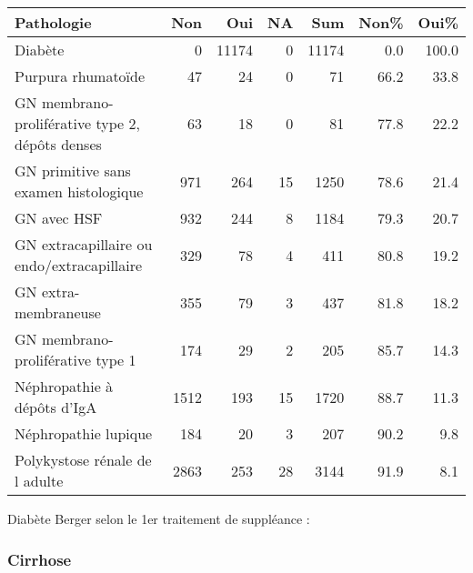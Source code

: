 \documentclass[11pt,a4paper]{article}\usepackage[]{graphicx}\usepackage[]{color}
\begin{document}
\begin{table}[H]
\centering
\begin{tabular}{lrrrrrr}
  \hline
Pathologie & Non & Oui & NA & Sum & Non\% & Oui\% \\ 
  \hline
Diabète &  0 & 11174 &  0 & 11174 & 0.0 & 100.0 \\ 
  Purpura rhumatoïde & 47 & 24 &  0 & 71 & 66.2 & 33.8 \\ 
  GN membrano-proliférative type 2, dépôts denses & 63 & 18 &  0 & 81 & 77.8 & 22.2 \\ 
  GN primitive sans examen histologique & 971 & 264 & 15 & 1250 & 78.6 & 21.4 \\ 
  GN avec HSF & 932 & 244 &  8 & 1184 & 79.3 & 20.7 \\ 
  GN extracapillaire ou endo/extracapillaire & 329 & 78 &  4 & 411 & 80.8 & 19.2 \\ 
  GN extra-membraneuse & 355 & 79 &  3 & 437 & 81.8 & 18.2 \\ 
  GN membrano-proliférative type 1 & 174 & 29 &  2 & 205 & 85.7 & 14.3 \\ 
  Néphropathie à dépôts d'IgA & 1512 & 193 & 15 & 1720 & 88.7 & 11.3 \\ 
  Néphropathie lupique & 184 & 20 &  3 & 207 & 90.2 & 9.8 \\ 
  Polykystose rénale de l adulte & 2863 & 253 & 28 & 3144 & 91.9 & 8.1 \\ 
   \hline
\end{tabular}
\end{table}

% 
% 
% 
% 
% 

Diabète Berger selon le 1er traitement de suppléance :



\subsubsection*{Cirrhose}
\end{document}
